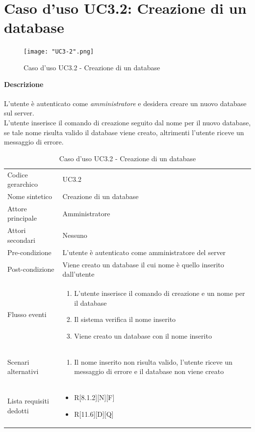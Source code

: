 \documentclass[a4paper]{report}
\begin{document}
	 \section{Caso d'uso UC3.2: Creazione di un database}
	 	\begin{figure}[H]
			\centering
			\texttt{[image: "UC3-2".png]}
			\caption{Caso d'uso UC3.2 - Creazione di un database}
		\end{figure}
	 \textbf{Descrizione} \\ \\
	 L'utente è autenticato come \emph{amministratore} e desidera creare un nuovo database sul server. 
	 \\ L'utente inserisce il comando di creazione seguito dal nome per il nuovo database, se tale nome risulta
	  valido il database viene creato, altrimenti l'utente riceve un messaggio di errore. \\
		\begin{table}[H]
		\begin{tabularx}{\textwidth}{X | X}\toprule
			\rowcolor{orange!65}Codice gerarchico & UC3.2 \\
			Nome sintetico & Creazione di un database \\
			\rowcolor{orange!65}Attore principale & Amministratore\\
			Attori secondari & Nessuno \\
			\rowcolor{orange!65}Pre-condizione & L'utente è autenticato come amministratore del server\\
			Post-condizione & Viene creato un database il cui nome è quello inserito dall'utente \\
			\rowcolor{orange!65}Flusso eventi & \begin{enumerate}
			\item L'utente inserisce il comando di creazione e un nome per il database
			\item Il sistema verifica il nome inserito
			\item Viene creato un database con il nome inserito
			\end{enumerate} \\
			Scenari alternativi & \begin{enumerate}
			\item Il nome inserito non risulta valido, l'utente riceve un messaggio di errore e il database non
			 viene creato
			\end{enumerate} \\
			\rowcolor{orange!65}Lista requisiti dedotti & \begin{itemize}
				\item R[8.1.2][N][F]
				\item R[11.6][D][Q]
				\end{itemize} \\
			\bottomrule
		\end{tabularx}
		\caption{Caso d'uso UC3.2 - Creazione di un database}
	 \end{table}
\end{document}
